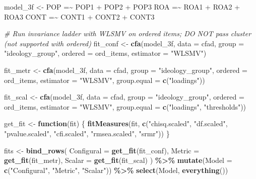 \documentclass[
  10pt,
]{article}
\newenvironment{Shaded}{\begin{snugshade}}{\end{snugshade}}
\newcommand{\AttributeTok}[1]{\textcolor[rgb]{0.13,0.29,0.53}{#1}}
\newcommand{\CommentTok}[1]{\textcolor[rgb]{0.56,0.35,0.01}{\textit{#1}}}
\newcommand{\ControlFlowTok}[1]{\textcolor[rgb]{0.13,0.29,0.53}{\textbf{#1}}}
\newcommand{\FunctionTok}[1]{\textcolor[rgb]{0.13,0.29,0.53}{\textbf{#1}}}
\newcommand{\NormalTok}[1]{#1}
\newcommand{\OtherTok}[1]{\textcolor[rgb]{0.56,0.35,0.01}{#1}}
\newcommand{\SpecialCharTok}[1]{\textcolor[rgb]{0.81,0.36,0.00}{\textbf{#1}}}
\newcommand{\StringTok}[1]{\textcolor[rgb]{0.31,0.60,0.02}{#1}}
\begin{document}
\begin{Shaded}
\begin{Highlighting}[]
\NormalTok{model\_3f }\OtherTok{\textless{}{-}} \StringTok{\textquotesingle{}}
\StringTok{  POP =\textasciitilde{} POP1 + POP2 + POP3}
\StringTok{  ROA =\textasciitilde{} ROA1 + ROA2 + ROA3}
\StringTok{  CONT =\textasciitilde{} CONT1 + CONT2 + CONT3}
\StringTok{\textquotesingle{}}
\end{Highlighting}
\end{Shaded}

\begin{Shaded}
\begin{Highlighting}[]
\CommentTok{\# Run invariance ladder with WLSMV on ordered items; DO NOT pass cluster (not supported with ordered)}
\NormalTok{fit\_conf }\OtherTok{\textless{}{-}} \FunctionTok{cfa}\NormalTok{(model\_3f, }\AttributeTok{data =}\NormalTok{ cfad, }\AttributeTok{group =} \StringTok{"ideology\_group"}\NormalTok{,}
                \AttributeTok{ordered =}\NormalTok{ ord\_items, }\AttributeTok{estimator =} \StringTok{"WLSMV"}\NormalTok{)}

\NormalTok{fit\_metr }\OtherTok{\textless{}{-}} \FunctionTok{cfa}\NormalTok{(model\_3f, }\AttributeTok{data =}\NormalTok{ cfad, }\AttributeTok{group =} \StringTok{"ideology\_group"}\NormalTok{,}
                \AttributeTok{ordered =}\NormalTok{ ord\_items, }\AttributeTok{estimator =} \StringTok{"WLSMV"}\NormalTok{,}
                \AttributeTok{group.equal =} \FunctionTok{c}\NormalTok{(}\StringTok{"loadings"}\NormalTok{))}

\NormalTok{fit\_scal }\OtherTok{\textless{}{-}} \FunctionTok{cfa}\NormalTok{(model\_3f, }\AttributeTok{data =}\NormalTok{ cfad, }\AttributeTok{group =} \StringTok{"ideology\_group"}\NormalTok{,}
                \AttributeTok{ordered =}\NormalTok{ ord\_items, }\AttributeTok{estimator =} \StringTok{"WLSMV"}\NormalTok{,}
                \AttributeTok{group.equal =} \FunctionTok{c}\NormalTok{(}\StringTok{"loadings"}\NormalTok{, }\StringTok{"thresholds"}\NormalTok{))}

\NormalTok{get\_fit }\OtherTok{\textless{}{-}} \ControlFlowTok{function}\NormalTok{(fit) \{}
  \FunctionTok{fitMeasures}\NormalTok{(fit, }\FunctionTok{c}\NormalTok{(}\StringTok{"chisq.scaled"}\NormalTok{, }\StringTok{"df.scaled"}\NormalTok{, }\StringTok{"pvalue.scaled"}\NormalTok{,}
                    \StringTok{"cfi.scaled"}\NormalTok{, }\StringTok{"rmsea.scaled"}\NormalTok{, }\StringTok{"srmr"}\NormalTok{))}
\NormalTok{\}}

\NormalTok{fits }\OtherTok{\textless{}{-}} \FunctionTok{bind\_rows}\NormalTok{(}
  \AttributeTok{Configural =} \FunctionTok{get\_fit}\NormalTok{(fit\_conf),}
  \AttributeTok{Metric     =} \FunctionTok{get\_fit}\NormalTok{(fit\_metr),}
  \AttributeTok{Scalar     =} \FunctionTok{get\_fit}\NormalTok{(fit\_scal)}
\NormalTok{) }\SpecialCharTok{\%\textgreater{}\%}
  \FunctionTok{mutate}\NormalTok{(}\AttributeTok{Model =} \FunctionTok{c}\NormalTok{(}\StringTok{"Configural"}\NormalTok{, }\StringTok{"Metric"}\NormalTok{, }\StringTok{"Scalar"}\NormalTok{)) }\SpecialCharTok{\%\textgreater{}\%}
  \FunctionTok{select}\NormalTok{(Model, }\FunctionTok{everything}\NormalTok{())}


\end{Highlighting}
\end{Shaded}
\end{document}
